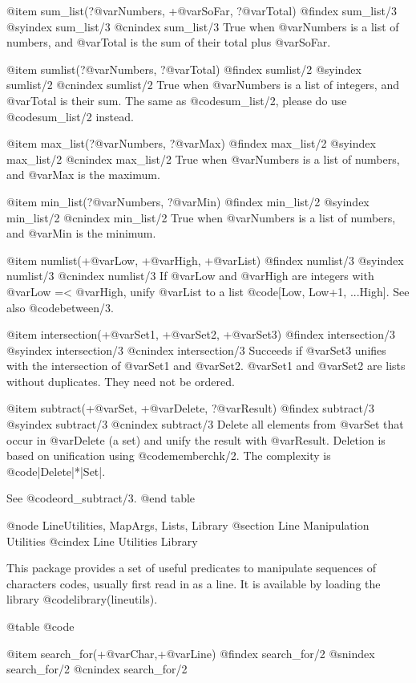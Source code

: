 @item sum_list(?@var{Numbers}, +@var{SoFar}, ?@var{Total})
@findex sum_list/3
@syindex sum_list/3
@cnindex sum_list/3
True when @var{Numbers} is a list of numbers, and @var{Total} is the sum of their total plus @var{SoFar}.

@item sumlist(?@var{Numbers}, ?@var{Total})
@findex sumlist/2
@syindex sumlist/2
@cnindex sumlist/2
True when @var{Numbers} is a list of integers, and @var{Total} is their
sum. The same as @code{sum_list/2}, please do use @code{sum_list/2}
instead.

@item max_list(?@var{Numbers}, ?@var{Max})
@findex max_list/2
@syindex max_list/2
@cnindex max_list/2
True when @var{Numbers} is a list of numbers, and @var{Max} is the maximum.

@item min_list(?@var{Numbers}, ?@var{Min})
@findex min_list/2
@syindex min_list/2
@cnindex min_list/2
True when @var{Numbers} is a list of numbers, and @var{Min} is the minimum.

@item numlist(+@var{Low}, +@var{High}, +@var{List})
@findex numlist/3
@syindex numlist/3
@cnindex numlist/3
If @var{Low} and @var{High} are integers with @var{Low} =<
@var{High}, unify @var{List} to a list @code{[Low, Low+1, ...High]}. See
also @code{between/3}.

@item intersection(+@var{Set1}, +@var{Set2}, +@var{Set3})
@findex intersection/3
@syindex intersection/3
@cnindex intersection/3
Succeeds if @var{Set3} unifies with the intersection of @var{Set1} and
@var{Set2}. @var{Set1} and @var{Set2} are lists without duplicates. They
need not be ordered.

@item subtract(+@var{Set}, +@var{Delete}, ?@var{Result})
@findex subtract/3
@syindex subtract/3
@cnindex subtract/3
Delete all elements from @var{Set} that   occur  in @var{Delete} (a set)
and unify the  result  with  @var{Result}.   Deletion  is  based  on
unification using @code{memberchk/2}. The complexity is
@code{|Delete|*|Set|}.

See @code{ord_subtract/3}.
@end table

@node LineUtilities, MapArgs, Lists, Library
@section Line Manipulation Utilities
@cindex Line Utilities Library

This package provides a set of useful predicates to manipulate
sequences of characters codes, usually first read in as a line. It is
available by loading the library @code{library(lineutils)}.

@table @code

@item search_for(+@var{Char},+@var{Line})
@findex search_for/2
@snindex search_for/2
@cnindex search_for/2

